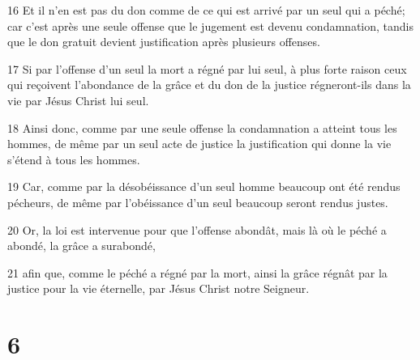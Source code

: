 \par 16 Et il n'en est pas du don comme de ce qui est arrivé par un seul qui a péché; car c'est après une seule offense que le jugement est devenu condamnation, tandis que le don gratuit devient justification après plusieurs offenses.
\par 17 Si par l'offense d'un seul la mort a régné par lui seul, à plus forte raison ceux qui reçoivent l'abondance de la grâce et du don de la justice régneront-ils dans la vie par Jésus Christ lui seul.
\par 18 Ainsi donc, comme par une seule offense la condamnation a atteint tous les hommes, de même par un seul acte de justice la justification qui donne la vie s'étend à tous les hommes.
\par 19 Car, comme par la désobéissance d'un seul homme beaucoup ont été rendus pécheurs, de même par l'obéissance d'un seul beaucoup seront rendus justes.
\par 20 Or, la loi est intervenue pour que l'offense abondât, mais là où le péché a abondé, la grâce a surabondé,
\par 21 afin que, comme le péché a régné par la mort, ainsi la grâce régnât par la justice pour la vie éternelle, par Jésus Christ notre Seigneur.

\chapter{6}

